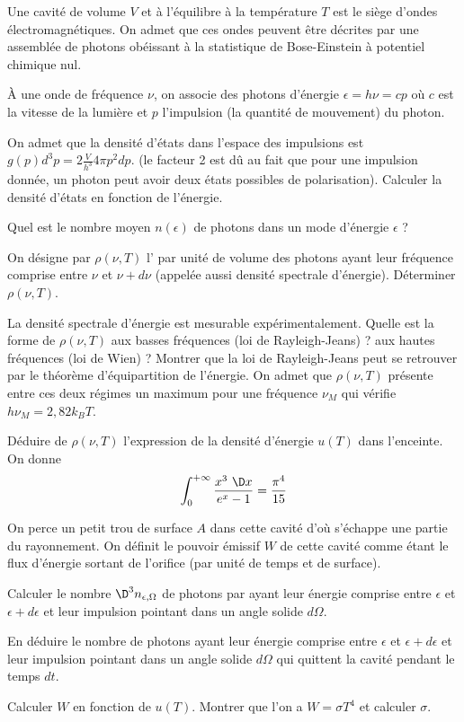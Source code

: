 Une cavité de volume $V$ et à l'équilibre à la température $T$  est le siège d'ondes électromagnétiques. On admet que ces ondes peuvent être décrites par une assemblée de photons obéissant à la statistique de Bose-Einstein à potentiel chimique nul. 

\`A une onde de fréquence $\nu$, on associe des photons d'énergie $\epsilon=h \nu= cp$ où $c$ est la vitesse de la lumière et $p$ l'impulsion (la quantité de mouvement) du photon.

\question
On admet que la densité d'états dans l'espace des impulsions est $g(p) d^3p =2 \frac{V}{h^3} 4 \pi p^2 dp$. (le facteur 2 est dû au fait que pour une impulsion donnée, un photon peut avoir deux états possibles de polarisation). Calculer la densité d'états en fonction de l'énergie.

\question
Quel est le nombre moyen   $n(\epsilon)$ de photons dans un mode d'énergie $\epsilon$ ?

\question
On désigne par $\rho(\nu, T)$ l' par unité de volume des photons ayant leur fréquence comprise entre $\nu$ et $\nu+d\nu$ (appelée aussi densité spectrale d'énergie). Déterminer $\rho(\nu, T)$.

\question
La densité spectrale d'énergie est mesurable expérimentalement. Quelle est la forme de $\rho(\nu, T)$ aux basses fréquences (loi de Rayleigh-Jeans) ?  aux hautes fréquences (loi de Wien) ? Montrer que la loi de Rayleigh-Jeans peut se retrouver par le théorème d'équipartition de l'énergie. On admet que $\rho(\nu, T)$ présente entre ces deux régimes un maximum pour une fréquence $\nu_M$ qui vérifie $h \nu_M=2,82 k_B T$.

\question
Déduire de $\rho(\nu, T)$ l'expression de la densité d'énergie $u(T)$ dans l'enceinte. On donne
$$
\int_0^{+\infty} \frac{x^3 \ \D x}{e^x-1}=\frac{\pi^4}{15}
$$

\medskip

On perce un petit trou de surface $A$ dans cette cavité d'où s'échappe une partie du rayonnement. On définit le pouvoir émissif $W$ de cette cavité comme étant le flux d'énergie sortant de l'orifice (par unité de temps et de surface).

\question
Calculer le nombre $\D ^3 n_{\epsilon, \Omega}$ de photons par  ayant leur énergie comprise entre $\epsilon$ et $\epsilon+ d\epsilon$ et leur impulsion pointant dans un angle solide $d\Omega$.

\question
En déduire le nombre de photons ayant leur énergie comprise entre $\epsilon$ et $\epsilon+ d\epsilon$ et leur impulsion pointant dans un angle solide $d\Omega$ qui quittent la cavité pendant le temps $dt$. 

\question
Calculer $W$ en fonction de $u(T)$.  Montrer que l'on a $W=\sigma T^4$ et calculer $\sigma$.


